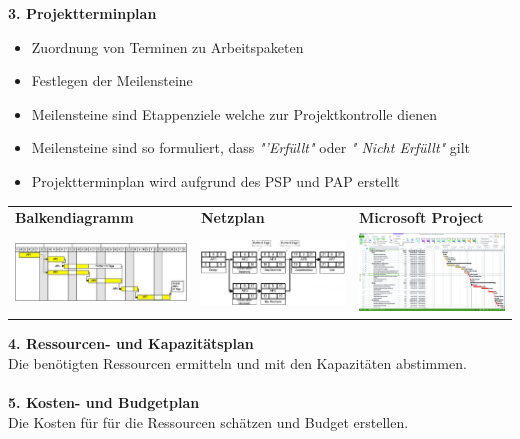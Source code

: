 \pagebreak
\textbf{3. Projektterminplan}
\begin{itemize}
	\item Zuordnung von Terminen zu Arbeitspaketen
	\item Festlegen der Meilensteine
	\item Meilensteine sind Etappenziele welche zur Projektkontrolle dienen
	\item Meilensteine sind so formuliert, dass \textit{"'Erfüllt"} oder \textit{" Nicht Erfüllt"} gilt
	\item Projektterminplan wird aufgrund des PSP und PAP erstellt
\end{itemize}
\begin{table}[h!]
	\begin{tabular}{l l l}
		 \textbf{Balkendiagramm} & \textbf{Netzplan} & \textbf{Microsoft Project} \\
		 \includegraphics[width=6cm]{images/balkendiagramm} & \includegraphics[width=6cm]{images/netzplan}	& \includegraphics[width=6cm]{images/msproject}	 
	\end{tabular}
\end{table}
\vspace{0.2cm}
\textbf{4. Ressourcen- und Kapazitätsplan}\\
Die benötigten Ressourcen ermitteln und mit den Kapazitäten abstimmen. 
\\
\\
\textbf{5. Kosten- und Budgetplan}\\
Die Kosten für für die Ressourcen schätzen und Budget erstellen. 

